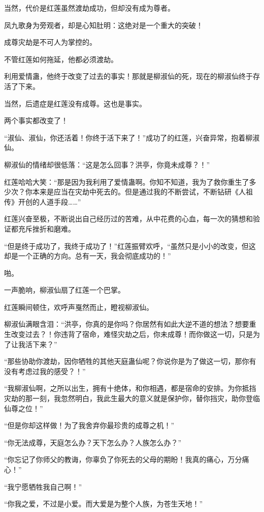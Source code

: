 \begin{this_body}
当然，代价是红莲虽然渡劫成功，但却没有成为尊者。

凤九歌身为旁观者，却是心知肚明：这绝对是一个重大的突破！

成尊灾劫是不可人为掌控的。

不管红莲如何拖延，他都必须渡劫。

利用爱情蛊，他终于改变了过去的事实！那就是柳淑仙的死，现在的柳淑仙终于存活了下来。

当然，后遗症是红莲没有成尊。这也是事实。

两个事实都改变了！

“淑仙、淑仙，你还活着！你终于活下来了！”成功了的红莲，兴奋异常，抱着柳淑仙。

柳淑仙的情绪却很低落：“这是怎么回事？洪亭，你竟未成尊？！”

红莲哈哈大笑：“那是因为我利用了爱情蛊啊。你知不知道，我为了救你重生了多少次？你本来是应当在灾劫中死去的。但是通过我的不断尝试，不断钻研《人祖传》开创的人道手段……”

红莲兴奋至极，不断说出自己经历过的苦难，从中花费的心血，每一次的猜想和验证都充斥挫折和磨难。

“但是终于成功了，我终于成功了！”红莲振臂欢呼，“虽然只是小小的改变，但这却是一个正确的方向。总有一天，我会彻底成功的！”

啪。

一声脆响，柳淑仙扇了红莲一个巴掌。

红莲瞬间顿住，欢呼声戛然而止，瞪视柳淑仙。

柳淑仙满眼含泪：“洪亭，你真的是你吗？你居然有如此大逆不道的想法？想要重生改变过去？！你违背了宿命，难怪灾劫之后，你未成尊！而你做这一切，只是为了让我活下来？”

“那些协助你渡劫，因你牺牲的其他天庭蛊仙呢？你说你是为了做这一切，那你有没有考虑过我的感受？！”

“我柳淑仙啊，之所以出生，拥有十绝体，和你相遇，都是宿命的安排。为你抵挡灾劫的那一刻，我忽然明白，我此生最大的意义就是保护你，替你挡灾，助你登临仙尊之位！”

“但是你却这样做！为了我舍弃你最珍贵的成尊之机！”

“你无法成尊，天庭怎么办？天下怎么办？人族怎么办？”

“你忘记了你师父的教诲，你辜负了你死去的父母的期盼！我真的痛心，万分痛心！”

“我宁愿牺牲我自己啊！”

“你我之爱，不过是小爱。而大爱是为整个人族，为苍生天地！”


\end{this_body}
